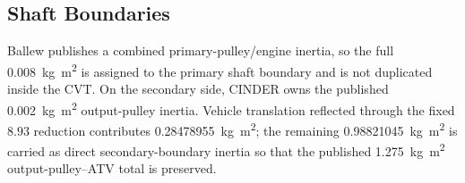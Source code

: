 \documentclass[11pt]{report}
\numberwithin{equation}{section}
\begin{document}
\subsection{Shaft Boundaries}
\label{app:ballew_boundaries}

Ballew publishes a combined primary-pulley/engine inertia, so the full
\SI{0.008}{\kilogram\meter\squared} is assigned to the primary shaft boundary
and is not duplicated inside the CVT. On the secondary side, CINDER owns the
published \SI{0.002}{\kilogram\meter\squared} output-pulley inertia. Vehicle
translation reflected through the fixed \(8.93\) reduction contributes
\SI{0.28478955}{\kilogram\meter\squared}; the remaining
\SI{0.98821045}{\kilogram\meter\squared} is carried as direct
secondary-boundary inertia so that the published
\SI{1.275}{\kilogram\meter\squared} output-pulley--ATV total is preserved.
\end{document}
